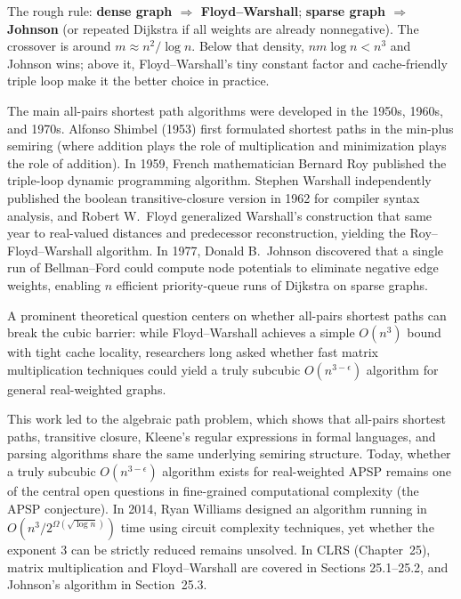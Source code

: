 The rough rule: \textbf{dense graph $\Rightarrow$ Floyd--Warshall};
\textbf{sparse graph $\Rightarrow$ Johnson} (or repeated Dijkstra if all weights
are already nonnegative). The crossover is around $m \approx n^2 / \log n$.
Below that density, $n m \log n < n^3$ and Johnson wins; above it,
Floyd--Warshall's tiny constant factor and cache-friendly triple loop make it
the better choice in practice.

\begin{historybox}
The main all-pairs shortest path algorithms were developed in the 1950s, 1960s, and 1970s. Alfonso Shimbel (1953) first formulated shortest paths in the min-plus semiring (where addition plays the role of multiplication and minimization plays the role of addition). In 1959, French mathematician Bernard Roy published the triple-loop dynamic programming algorithm. Stephen Warshall independently published the boolean transitive-closure version in 1962 for compiler syntax analysis, and Robert W.\ Floyd generalized Warshall's construction that same year to real-valued distances and predecessor reconstruction, yielding the Roy--Floyd--Warshall algorithm. In 1977, Donald B.\ Johnson discovered that a single run of Bellman--Ford could compute node potentials to eliminate negative edge weights, enabling $n$ efficient priority-queue runs of Dijkstra on sparse graphs.

A prominent theoretical question centers on whether all-pairs shortest paths can break the cubic barrier: while Floyd--Warshall achieves a simple $O(n^3)$ bound with tight cache locality, researchers long asked whether fast matrix multiplication techniques could yield a truly subcubic $O(n^{3-\epsilon})$ algorithm for general real-weighted graphs.

This work led to the algebraic path problem, which shows that all-pairs shortest paths, transitive closure, Kleene's regular expressions in formal languages, and parsing algorithms share the same underlying semiring structure. Today, whether a truly subcubic $O(n^{3-\epsilon})$ algorithm exists for real-weighted APSP remains one of the central open questions in fine-grained computational complexity (the APSP conjecture). In 2014, Ryan Williams designed an algorithm running in $O(n^3 / 2^{\Omega(\sqrt{\log n})})$ time using circuit complexity techniques, yet whether the exponent $3$ can be strictly reduced remains unsolved. In CLRS (Chapter~25), matrix multiplication and Floyd--Warshall are covered in Sections 25.1--25.2, and Johnson's algorithm in Section~25.3.
\end{historybox}

